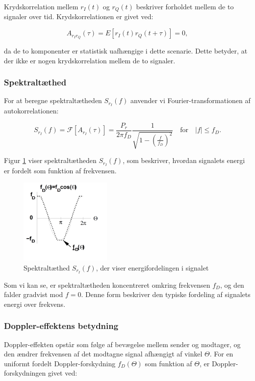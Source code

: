 \documentclass[a4paper,12pt]{book}
\begin{document}
	Krydskorrelation mellem $r_I(t)$ og $r_Q(t)$ beskriver forholdet mellem de to signaler over tid. Krydskorrelationen er givet ved:
	
	\[
	A_{r_I r_Q}(\tau) = E[r_I(t)r_Q(t + \tau)] = 0,
	\]
	
	da de to komponenter er statistisk uafhængige i dette scenarie. Dette betyder, at der ikke er nogen krydskorrelation mellem de to signaler.
	
	\subsubsection{Spektraltæthed}
	For at beregne spektraltætheden $S_{r_I}(f)$ anvender vi Fourier-transformationen af autokorrelationen:
	
	\[
	S_{r_I}(f) = \mathcal{F}[A_{r_I}(\tau)] = \frac{P_r}{2\pi f_D} \frac{1}{\sqrt{1 - \left(\frac{f}{f_D}\right)^2}} \quad \text{for} \quad |f| \leq f_D.
	\]
	
	Figur \ref{fig:spectrum_density} viser spektraltætheden $S_{r_I}(f)$, som beskriver, hvordan signalets energi er fordelt som funktion af frekvensen.
	\begin{figure}[h!]
		\centering
		\includegraphics[width=0.4\textwidth]{fig/fig21.png}
		\caption{Spektraltæthed $S_{r_I}(f)$, der viser energifordelingen i signalet}
		\label{fig:spectrum_density}
	\end{figure}
	
	Som vi kan se, er spektraltætheden koncentreret omkring frekvensen $f_D$, og den falder gradvist mod $f = 0$. Denne form beskriver den typiske fordeling af signalets energi over frekvens.
	
	\subsubsection{Doppler-effektens betydning}
	Doppler-effekten opstår som følge af bevægelse mellem sender og modtager, og den ændrer frekvensen af det modtagne signal afhængigt af vinkel $\Theta$. For en uniformt fordelt Doppler-forskydning $f_D(\Theta)$ som funktion af $\Theta$, er Doppler-forskydningen givet ved:
	
\end{document}
